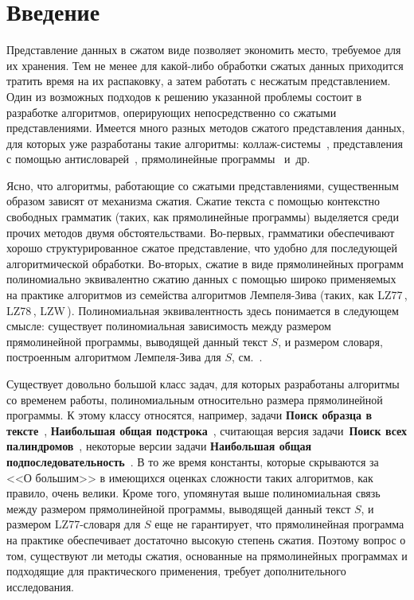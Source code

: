 \documentclass[14pt]{article}
\renewcommand{\normalsize}{\fontsize{14}{18pt}\selectfont}
\begin{document}
\clearpage
\setcounter{page}{2}

\begin{singlespace}
\normalsize
\tableofcontents
\newpage
\end{singlespace}

\section{Введение}

Представление данных в сжатом виде позволяет экономить место,
требуемое для их хранения. Тем не менее для какой-либо обработки сжатых данных приходится тратить время на их распаковку, а затем
работать с несжатым представлением. Один из возможных подходов к решению указанной проблемы состоит в разработке
алгоритмов, оперирующих непосредственно со сжатыми представлениями. Имеется много разных методов сжатого представления данных,
для которых уже разработаны такие алгоритмы: коллаж-системы~\cite{collages}, представления с помощью антисловарей~\cite{antidictionaries},
прямолинейные программы~\cite{RytterSLPConstruction} и~др.

Ясно, что алгоритмы, работающие со сжатыми представлениями, существенным образом зависят от механизма сжатия. Сжатие текста с помощью
контекстно свободных грамматик (таких, как прямолинейные программы) выделяется среди прочих методов двумя обстоятельствами. Во-первых,
грамматики обеспечивают хорошо структурированное сжатое представление, что удобно для последующей алгоритмической обработки.
Во-вторых, сжатие в виде прямолинейных программ полиномиально эквивалентно сжатию данных с помощью широко применяемых на практике
алгоритмов из семейства алгоритмов Лемпеля-Зива (таких, как LZ77\,\cite{LZ77}, LZ78\,\cite{LZ78}, LZW\,\cite{LZW}).
Полиномиальная эквивалентность здесь понимается в следующем смысле: существует полиномиальная
зависимость между размером прямолинейной программы, выводящей данный текст $S$, и размером словаря,
построенным алгоритмом Лемпеля-Зива для $S$, см.~\cite{RytterSLPConstruction}.

Существует довольно большой класс задач, для которых разработаны алгоритмы со временем работы, полиномиальным
относительно размера прямолинейной программы. К этому классу относятся, например, задачи \textbf{Поиск образца в тексте}~\cite{PM_and_HD},
\textbf{Наибольшая общая подстрока}~\cite{LCSubstring}, считающая версия задачи~\textbf{Поиск всех палиндромов}~\cite{LCSubstring},
некоторые версии задачи \textbf{Наибольшая общая подпоследовательность}~\cite{LCS_P}. В то же время константы,
которые скрываются за <<О большим>> в имеющихся оценках сложности таких алгоритмов, как правило, очень велики.
Кроме того, упомянутая выше полиномиальная связь между размером прямолинейной программы, выводящей данный текст $S$, и размером
LZ77-словаря для $S$ еще не гарантирует, что прямолинейная программа на практике обеспечивает достаточно высокую степень сжатия.
Поэтому вопрос о том, существуют ли методы сжатия, основанные на прямолинейных программах и подходящие для практического применения,
требует дополнительного исследования.
\end{document}
